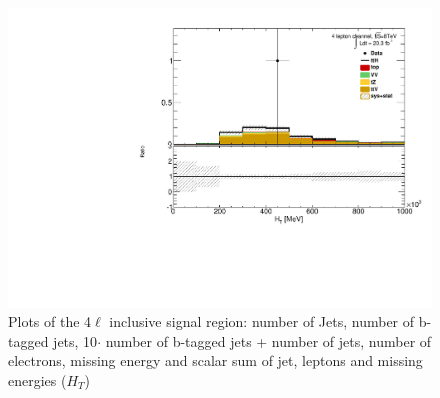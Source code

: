 \begin{figure}[!htbp]
\begin{minipage}[h]{0.5\textwidth}
    \centering \includegraphics[width=\textwidth]{figs/results/plotCand_4lep_HT}
  \end{minipage}\hfill
\caption{Plots of the 4$\ell$  inclusive signal region: number of Jets, number of b-tagged jets, 10$\cdot$ number of b-tagged jets + number of jets, number of electrons, missing energy and scalar sum of jet, leptons and missing energies ($H_T$) } 
\label{figure:results_4l_event}
\end{figure} 

